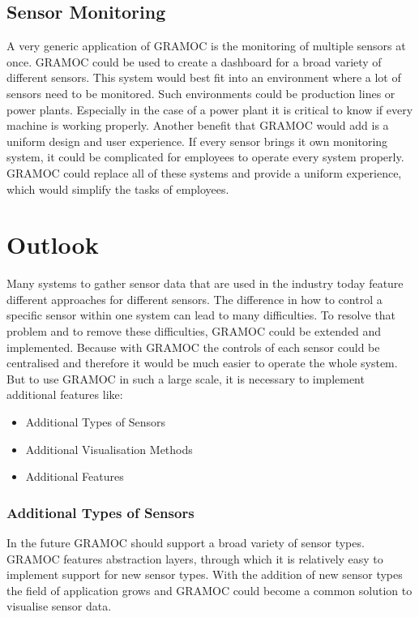 \subsection{Sensor Monitoring}
A very generic application of GRAMOC is the monitoring of multiple sensors at once. GRAMOC could be used to create a dashboard for a broad variety of different sensors. This system would best fit into an environment where a lot of sensors need to be monitored. Such environments could be production lines or power plants. Especially in the case of a power plant it is critical to know if every machine is working properly. Another benefit that GRAMOC would add is a uniform design and user experience. If every sensor brings it own monitoring system, it could be complicated for employees to operate every system properly. GRAMOC could replace all of these systems and provide a uniform experience, which would simplify the tasks of employees.

\section{Outlook}
Many systems to gather sensor data that are used in the industry today feature different approaches for different sensors. The difference in how to control a specific sensor within one system can lead to many difficulties. To resolve that problem and to remove these difficulties, GRAMOC could be extended and implemented. Because with GRAMOC the controls of each sensor could be centralised and therefore it would be much easier to operate the whole system. But to use GRAMOC in such a large scale, it is necessary to implement additional features like:

\begin{itemize}
    \item Additional Types of Sensors
    \item Additional Visualisation Methods
    \item Additional Features
\end{itemize}

\subsubsection{Additional Types of Sensors}
In the future GRAMOC should support a broad variety of sensor types. GRAMOC features abstraction layers, through which it is relatively easy to implement support for new sensor types. With the addition of new sensor types the field of application grows and GRAMOC could become a common solution to visualise sensor data.

